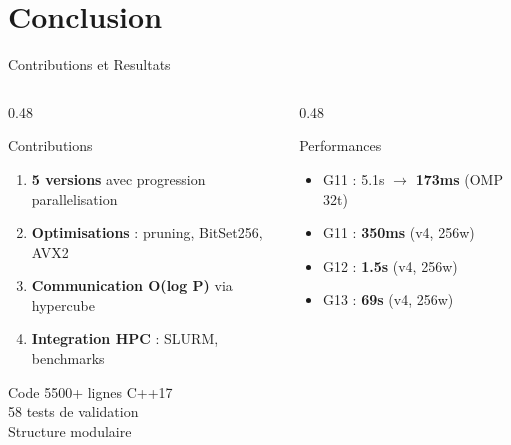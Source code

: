 \documentclass[aspectratio=169,9pt]{beamer}
\begin{document}
\section{Conclusion}

\begin{frame}{Contributions et Resultats}
    \begin{columns}[T]
        \begin{column}{0.48\textwidth}
            \begin{block}{Contributions}
                \begin{enumerate}\small
                    \item \textbf{5 versions} avec progression parallelisation
                    \item \textbf{Optimisations} : pruning, BitSet256, AVX2
                    \item \textbf{Communication O(log P)} via hypercube
                    \item \textbf{Integration HPC} : SLURM, benchmarks
                \end{enumerate}
            \end{block}
            \begin{alertblock}{Code}
                \small
                5500+ lignes C++17\\
                58 tests de validation\\
                Structure modulaire
            \end{alertblock}
        \end{column}
        \begin{column}{0.48\textwidth}
            \begin{exampleblock}{Performances}
                \small
                \begin{itemize}
                    \item G11 : 5.1s $\rightarrow$ \textbf{173ms} (OMP 32t)
                    \item G11 : \textbf{350ms} (v4, 256w)
                    \item G12 : \textbf{1.5s} (v4, 256w)
                    \item G13 : \textbf{69s} (v4, 256w)

\end{itemize}
\end{exampleblock}
\end{column}
\end{columns}
\end{frame}
\end{document}

